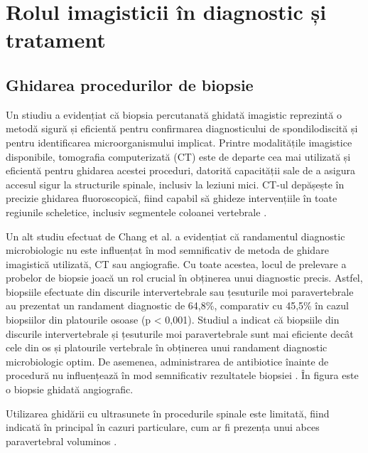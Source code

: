 \message{ !name(LaMain.tex)}\documentclass[romanian,12pt,a4paper]{article}
\begin{document}
\section{Rolul imagisticii în diagnostic și tratament}

\subsection{Ghidarea procedurilor de biopsie}

Un stiudiu a evidențiat că biopsia percutanată ghidată imagistic
reprezintă o metodă sigură și eficientă pentru confirmarea
diagnosticului de spondilodiscită și pentru identificarea
microorganismului implicat. Printre modalitățile imagistice disponibile,
tomografia computerizată (CT) este de departe cea mai utilizată și
eficientă pentru ghidarea acestei proceduri, datorită capacității sale
de a asigura accesul sigur la structurile spinale, inclusiv la leziuni
mici. CT-ul depășește în precizie ghidarea fluoroscopică, fiind capabil
să ghideze intervențiile în toate regiunile scheletice, inclusiv
segmentele coloanei vertebrale \cite{PercutaneousCTGuidedBone2023}.

Un alt studiu efectuat de Chang et al. a evidențiat că randamentul
diagnostic microbiologic nu este influențat în mod semnificativ de
metoda de ghidare imagistică utilizată, CT sau angiografie. Cu toate
acestea, locul de prelevare a probelor de biopsie joacă un rol crucial
în obținerea unui diagnostic precis. Astfel, biopsiile efectuate din
discurile intervertebrale sau țesuturile moi paravertebrale au prezentat
un randament diagnostic de 64,8\%, comparativ cu 45,5\% în cazul
biopsiilor din platourile osoase (p \textless{} 0,001). Studiul a
indicat că biopsiile din discurile intervertebrale și țesuturile moi
paravertebrale sunt mai eficiente decât cele din os și platourile
vertebrale în obținerea unui randament diagnostic microbiologic optim.
De asemenea, administrarea de antibiotice înainte de procedură nu
influențează în mod semnificativ rezultatele biopsiei
\cite{ImageGuidedBiopsyAcute2023}. În figura
\label{biop-48}{} este o biopsie ghidată angiografic.

Utilizarea ghidării cu ultrasunete în procedurile spinale este limitată,
fiind indicată în principal în cazuri particulare, cum ar fi prezența
unui abces paravertebral voluminos
\cite{UltrasoundGuidedPercutaneousBone2023}.
\end{document}
